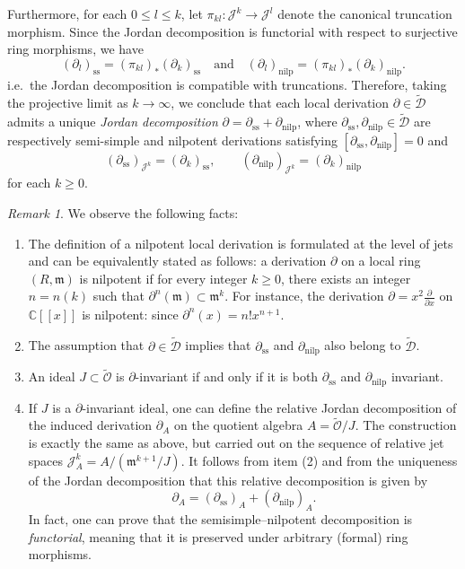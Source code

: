 \documentclass[10pt,twoside,reqno]{amsart}
\theoremstyle{remark}
\theoremstyle{remark}
\newtheorem{remark}[thm]{Remark}
\newcommand{\tmem}[1]{{\em #1\/}}
\newcommand{\tmop}[1]{{\operatorname{#1}}}
\newcommand{\tO}{\widetilde{\mathcal{O}}}
\newcommand{\cD}{\mathcal{D}}
\newcommand{\tcD}{\widetilde{\cD}}
\begin{document}
Furthermore, for each $0 \le l \le k$, let $\pi_{kl}: \mathcal{J}^k \rightarrow \mathcal{J}^l$ denote the canonical truncation morphism. Since the Jordan decomposition is functorial with respect to surjective ring morphisms, we have 
$$
(\partial_l)_{\tmop{ss}} = (\pi_{kl})_* (\partial_k)_{\tmop{ss}} \quad \text{and} \quad (\partial_l)_{\tmop{nilp}} = (\pi_{kl})_* (\partial_k)_{\tmop{nilp}}.
$$
i.e.~the Jordan decomposition is compatible with truncations. Therefore, taking the projective limit as $k \rightarrow \infty$, we conclude that each local derivation $\partial \in \tcD$ admits a unique {\tmem{Jordan decomposition}} $\partial = \partial_{\tmop{ss}} + \partial_{\tmop{nilp}}$, where $\partial_{\tmop{ss}}, \partial_{\tmop{nilp}} \in \tcD$ are respectively semi-simple and nilpotent derivations satisfying 
$[\partial_{\tmop{ss}}, \partial_{\tmop{nilp}}] = 0$ and 
$$
(\partial_{\tmop{ss}})_{\mathcal{J}^k}=(\partial_k)_{\tmop{ss}},  \qquad(\partial_{\tmop{nilp}})_{\mathcal{J}^k}=(\partial_k)_{\tmop{nilp}} 
$$
for each $k\ge 0$. 
\begin{remark} We observe the following facts:
  \label{remark-invJordan} 
  \begin{enumerate}
  \item The definition of a nilpotent local derivation is formulated at the level of jets and can be equivalently stated as follows: a derivation $\partial$ on a local ring $(R, \mathfrak{m})$ is nilpotent if for every integer $k \ge 0$, there exists an integer $n = n(k)$ such that $\partial^n(\mathfrak{m}) \subset \mathfrak{m}^k$. For instance, the derivation $\partial = x^2 \frac{\partial}{\partial x}$ on $\mathbb C[[x]]$ is nilpotent: since $\partial^n(x) = n! x^{n+1}$. 
  \item The assumption that $\partial \in \tcD$ implies that $\partial_{\tmop{ss}}$ and $\partial_{\tmop{nilp}}$ also belong to $\tcD$.   
  \item An ideal $J \subset \widetilde{\mathcal{O}}$ is
  $\partial$-invariant if and only if it is both $\partial_{\tmop{ss}}
  $ and $\partial_{\tmop{nilp}}$ invariant.
  \item If $J$ is a $\partial$-invariant ideal, one can define the relative Jordan decomposition of the induced derivation $\partial_A$ on the quotient algebra $A=\tO/J$.
The construction is exactly the same as above, but carried out on the sequence of relative jet spaces
$\mathcal{J}^k_A = A/(\mathfrak{m}^{k+1}/J)$.
It follows from item (2) and from the uniqueness of the Jordan decomposition that this relative decomposition is given by
$$\partial_A = (\partial_{\mathrm{ss}})_A + (\partial_{\mathrm{nilp}})_A.$$
In fact, one can prove that the semisimple–nilpotent decomposition is {\em functorial}, meaning that it is preserved under arbitrary (formal) ring morphisms. 
\end{enumerate}
\end{remark}
\end{document}
